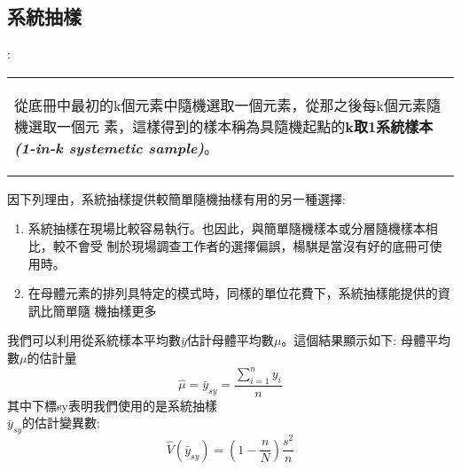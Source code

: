		\subsection{系統抽樣{}}:		 
		\begin{center}\colorbox{slight}{
				\begin{tabular}{p{}}
					\begin{de}\label{de:cluster}
						從底冊中最初的k個元素中隨機選取一個元素，從那之後每k個元素隨機選取一個元							素，這樣得到的樣本稱為具隨機起點的\textbf{k取1系統樣本\emph{(1-in-k 							systemetic sample)}}。											
					\end{de}
				\end{tabular}
			}
			\end{center}			
		因下列理由，系統抽樣提供較簡單隨機抽樣有用的另一種選擇:
		\begin{enumerate}
			\item{系統抽樣在現場比較容易執行。也因此，與簡單隨機樣本或分層隨機樣本相比，較不會受					制於現場調查工作者的選擇偏誤，楊騏是當沒有好的底冊可使用時。}
			\item{在母體元素的排列具特定的模式時，同樣的單位花費下，系統抽樣能提供的資訊比簡單隨					機抽樣更多}
		\end{enumerate}
		我們可以利用從系統樣本平均數$\bar{y}$估計母體平均數$\mu$。這個結果顯示如下:
		母體平均數$\mu$的估計量
		$$ \hat{\mu} = \bar{y}_{sy}=\frac{\sum^{n}_{i=1} y_i}{n} $$
		其中下標sy表明我們使用的是系統抽樣\\
		$\bar{y}_{sy}$的估計變異數:
		$$ \hat{V}(\bar{y}_{sy})=\left( 1-\frac{n}{N} \right)\frac{s^2}{n} $$
		

